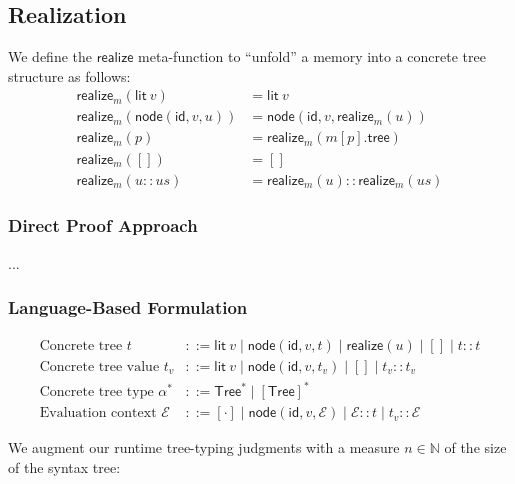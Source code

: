 \documentclass{article}
\newcommand{\mf}[1]{\mathsf{#1}}
\newcommand{\mc}[1]{\mathcal{#1}}
\newcommand{\semi}{\,;\,}
\newcommand{\dom}{\mf{dom}}
\newcommand{\hl}[1]{\colorbox{LightGoldenrod1}{#1}}
\newcommand{\tval}[4]{#1 \semi #2 \vdash_\Delta #3 : #4}
\newcommand{\tstr}{\mf{String}}
\newcommand{\tattr}{\mf{Attr}}
\newcommand{\ttree}{\mf{Tree}}
\renewcommand{\tt}{\mf{tt}}
\newcommand{\E}{\mc{E}}
\newcommand{\elit}[1]{\mf{lit}\ #1}
\newcommand{\enode}[3]{\mf{node}(\mf{#1}, #2, #3)}
\begin{document}
\subsection{Realization}

We define the $\mf{realize}$ meta-function to ``unfold'' a memory into
a concrete tree structure as follows:
\begin{align*}
\mf{realize}_m(\elit{v}) &= \elit{v}\\
\mf{realize}_m(\enode{id}{v}{u}) &= \enode{id}{v}{\mf{realize}_m(u)}\\
\mf{realize}_m(p) &= \mf{realize}_m(m[p].\mf{tree})\\
\mf{realize}_m([]) &= []\\
\mf{realize}_m(u :: us) &= \mf{realize}_m(u) :: \mf{realize}_m(us)
\end{align*}

\subsubsection{Direct Proof Approach}

\hl{...}

\subsubsection{Language-Based Formulation}

\begin{align*}
\text{Concrete tree } t &::= \elit{v} \mid \enode{id}{v}{t}
\mid \mf{realize}(u) \mid [] \mid t :: t\\
\text{Concrete tree value } t_v &::= \elit{v} \mid \enode{id}{v}{t_v}
\mid [] \mid t_v :: t_v\\
\text{Concrete tree type } \alpha^* &::= \ttree^* \mid [\ttree]^*\\
\text{Evaluation context } \E &::= [\cdot] \mid \enode{id}{v}{\E}
\mid \E :: t \mid t_v :: \E
\end{align*}

We augment our runtime
tree-typing judgments with a measure $n \in \mathbb{N}$ of the size
of the syntax tree:
\end{document}
